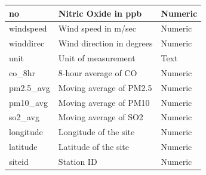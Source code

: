 \documentclass{article}
\begin{document}
\begin{itemize}
\begin{table}[h!]
\begin{tabular}{|>{\raggedright\arraybackslash}p{3cm}|p{5cm}|p{3cm}|}
\hline
no & Nitric Oxide in ppb & Numeric \\
\hline
windspeed & Wind speed in m/sec & Numeric \\
\hline
winddirec & Wind direction in degrees & Numeric \\
\hline
unit & Unit of measurement & Text \\
\hline
co\_8hr & 8-hour average of CO & Numeric \\
\hline
pm2.5\_avg & Moving average of PM2.5 & Numeric \\
\hline
pm10\_avg & Moving average of PM10 & Numeric \\
\hline
so2\_avg & Moving average of SO2 & Numeric \\
\hline
longitude & Longitude of the site & Numeric \\
\hline
latitude & Latitude of the site & Numeric \\
\hline
siteid & Station ID & Numeric \\
\hline
\end{tabular}
\label{tab:data_columns}
\end{table}
\end{itemize}
\end{document}
